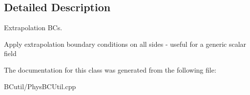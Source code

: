 \subsection{Detailed Description}
Extrapolation B\-Cs. 

Apply extrapolation boundary conditions on all sides -\/ useful for a generic scalar field 

The documentation for this class was generated from the following file\-:\begin{DoxyCompactItemize}
\item 
B\-Cutil/Phys\-B\-C\-Util.\-cpp\end{DoxyCompactItemize}

